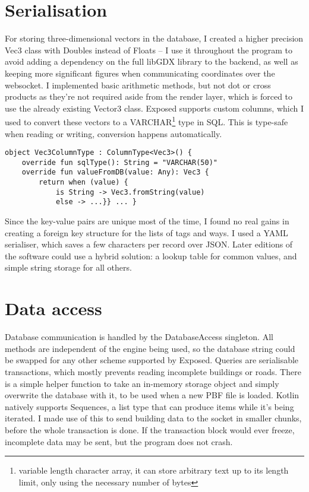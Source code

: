 \label{serialise}
\section{Serialisation}

For storing three-dimensional vectors in the database, I created a higher precision Vec3 class with Doubles instead of Floats -- I use it throughout the program to avoid adding a dependency on the full libGDX library to the backend, as well as keeping more significant figures when communicating coordinates over the websocket. I implemented basic arithmetic methods, but not dot or cross products as they're not required aside from the render layer, which is forced to use the already existing Vector3 class. Exposed supports custom columns, which I used to convert these vectors to a VARCHAR\footnote{variable length character array, it can store arbitrary text up to its length limit, only using the necessary number of bytes} type in SQL. This is type-safe when reading or writing, conversion happens automatically.
\begin{lstlisting}[caption=Custom column type in JetBrains Exposed]
    object Vec3ColumnType : ColumnType<Vec3>() {
    override fun sqlType(): String = "VARCHAR(50)"
    override fun valueFromDB(value: Any): Vec3 {
        return when (value) {
            is String -> Vec3.fromString(value)
            else -> ...}} ... }
\end{lstlisting}

Since the key-value pairs are unique most of the time, I found no real gains in creating a foreign key structure for the lists of tags and ways. I used a YAML serialiser, which saves a few characters per record over JSON. Later editions of the software could use a hybrid solution: a lookup table for common values, and simple string storage for all others.

\section{Data access}

Database communication is handled by the DatabaseAccess singleton. All methods are independent of the engine being used, so the database string could be swapped for any other scheme supported by Exposed. Queries are serialisable transactions, which mostly prevents reading incomplete buildings or roads. There is a simple helper function to take an in-memory storage object and simply overwrite the database with it, to be used when a new PBF file is loaded. Kotlin natively supports Sequences, a list type that can produce items while it's being iterated. I made use of this to send building data to the socket in smaller chunks, before the whole transaction is done. If the transaction block would ever freeze, incomplete data may be sent, but the program does not crash.
